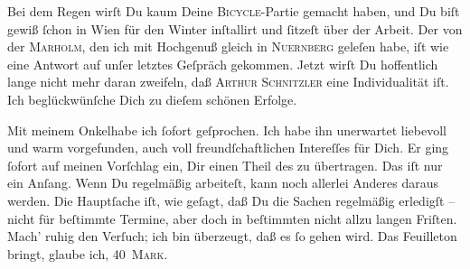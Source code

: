 \pstart
           Bei dem Regen wirſt Du kaum Deine \textsc{Bicycle}-Partie gemacht
               haben, und Du biſt gewiß{ }ſchon in Wien für den
               Winter inſtallirt und{ }ſitzeſt über der Arbeit. Der \label{K_L02612-3v}\label{K_L02612-3}{ }{\pb}von der \textsc{Marholm}, den ich mit Hochgenuß gleich in \textsc{Nuernberg} geleſen habe, iſt  wie eine Antwort auf unſer
               letztes Geſpräch gekommen. Jetzt wirſt Du hoffentlich lange nicht mehr daran
               zweifeln, daß \textsc{Arthur Schnitzler} eine Individualität iſt.
               Ich beglückwünſche Dich zu dieſem schönen Erfolge.\pend
           
\pstart
           Mit  meinem Onkelhabe ich{ }ſofort geſprochen. Ich habe ihn unerwartet
               liebevoll und warm vorgefunden, auch voll freundſchaftlichen Intereſſes für Dich. Er
               ging{ }ſofort auf meinen Vorſchlag ein, Dir einen Theil des \label{K_L02612-4v}\label{K_L02612-4} zu übertragen. Das iſt nur ein
               Anſang. Wenn Du regelmäßig arbeiteſt, kann noch {\pb}allerlei Anderes daraus werden. Die Hauptſache iſt, wie geſagt, daß Du die Sachen
               regelmäßig erledigſt – nicht für beſtimmte Termine, aber doch in beſtimmten nicht
               allzu langen Friſten. Mach’ ruhig den Verſuch; ich bin überzeugt, daß es{ }ſo gehen
               wird. Das Feuilleton bringt, {\pb}glaube ich, \textsc{40 Mark}.\pend
           
